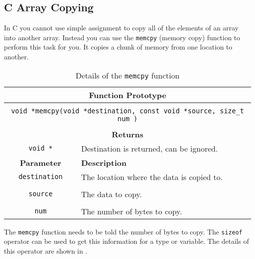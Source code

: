 \subsection{C Array Copying} %
\label{sub:c_array_copying}

In C you cannot use simple assignment to copy all of the elements of an array into another array. Instead you can use the \texttt{memcpy} (memory copy) function to perform this task for you. It copies a chunk of memory from one location to another.

\begin{table}[h]
  \centering
  \begin{tabular}{|c|p{9.5cm}|}
    \hline
    \multicolumn{2}{|c|}{\textbf{Function Prototype}} \\
    \hline
    \multicolumn{2}{|c|}{} \\
    \multicolumn{2}{|c|}{\texttt{void *memcpy(void *destination, const void *source, size\_t num )}} \\
    \multicolumn{2}{|c|}{} \\
    \hline
    \multicolumn{2}{|c|}{\textbf{Returns}} \\
    \hline
    \texttt{void *} & Destination is returned, can be ignored. \\
    \hline
    \textbf{Parameter} & \textbf{Description} \\
    \hline
    \texttt{ destination } & The location where the data is copied to.\\
    & \\
    \texttt{ source } & The data to copy.\\
    & \\
    \texttt{ num } & The number of bytes to copy. \\
    \hline
  \end{tabular}
  \caption{Details of the \texttt{memcpy} function}
  \label{tbl:memcpy}
\end{table}

The \texttt{memcpy} function needs to be told the number of bytes to copy. The \texttt{sizeof} operator can be used to get this information for a type or variable. The details of this operator are shown in . 




